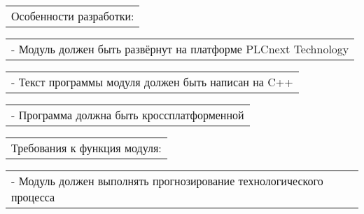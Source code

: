 \documentclass[12pt, А4, twoside]{article}
\begin{document}
\begin{FlushLeft}
		\vspace{-0.1 cm}
		
		\begin{tabular}{p{17.25cm}}
			\hspace{0.3cm} \textsf{Особенности разработки:} \vspace{0pt} \hline \\
		\end{tabular}
		
		\vspace{-0.1 cm}
		
		\begin{tabular}{p{17.25cm}}
			\hspace{0.6cm} \textsf{- Модуль должен быть развёрнут на платформе PLCnext Technology} \vspace{0pt} \hline \\
		\end{tabular}
		
		\vspace{-0.1 cm}
		
		\begin{tabular}{p{17.25cm}}
			\hspace{0.6cm} \textsf{- Текст программы модуля должен быть написан на C++}\vspace{0pt} \hline \\
		\end{tabular}
		
		\vspace{-0.1 cm}
		
		\begin{tabular}{p{17.25cm}}
			\hspace{0.6cm} \textsf{- Программа должна быть кроссплатформенной}\vspace{0pt} \hline 
		\end{tabular}
		
		\vspace{-0.1 cm}
		
		\begin{tabular}{p{17.25cm}}
			\hspace{0.3cm} \textsf{Требования к функция модуля:} \vspace{0pt} \hline \\
		\end{tabular}
		
		\vspace{-0.1 cm}
		
		\begin{tabular}{p{17.25cm}}
			\hspace{0.6cm} \textsf{- Модуль должен выполнять прогнозирование технологического процесса}\vspace{0pt} \hline \\
		\end{tabular}
		

\end{FlushLeft}
\end{document}
